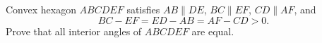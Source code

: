 Convex hexagon $ABCDEF$ satisfies $AB\parallel DE$, $BC\parallel EF$, $CD\parallel AF$, and
\[
BC-EF=ED-AB=AF-CD>0 .
\]
Prove that all interior angles of $ABCDEF$ are equal.
